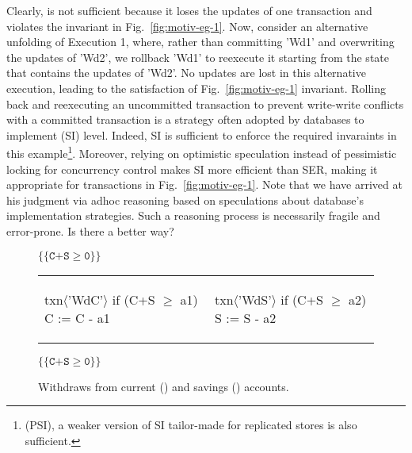 Clearly,  is not sufficient because it loses the
updates of one transaction and violates the invariant in
Fig.~\ref{fig:motiv-eg-1}. Now, consider an alternative unfolding of
Execution 1, where, rather than committing 'Wd1' and overwriting the
updates of 'Wd2', we rollback 'Wd1' to reexecute it starting from the
state that contains the updates of 'Wd2'. No updates are lost in this
alternative execution, leading to the satisfaction of
Fig.~\ref{fig:motiv-eg-1} invariant. Rolling back and reexecuting an
uncommitted transaction to prevent write-write conflicts with a
committed transaction is a strategy often adopted by databases to
implement  (SI) level. Indeed, SI is
sufficient to enforce the required invaraints in this
example\footnote{ (PSI), a weaker
version of SI tailor-made for replicated stores is also sufficient.}.
Moreover, relying on optimistic speculation instead of pessimistic
locking for concurrency control makes SI more efficient than SER,
making it appropriate for transactions in Fig.~\ref{fig:motiv-eg-1}.
Note that we have arrived at his judgment via adhoc reasoning based on
speculations about database's implementation strategies. Such a
reasoning process is necessarily fragile and error-prone. Is there a
better way?

\begin{figure}
\centering
$\{\{\texttt{C+S}\ge\texttt{0}\}\}$
\begin{tabular}{l||l}
\begin{txnimpcode}
  txn$\langle$'WdC'$\rangle${
    if (C+S $\ge$ a1) {
      C := C - a1
    }
  }
\end{txnimpcode}
&
\begin{txnimpcode}
  txn$\langle$'WdS'$\rangle${
    if (C+S $\ge$ a2) {
      S := S - a2
    }
  }
\end{txnimpcode}
\\
\end{tabular}
$\{\{\texttt{C+S}\ge\texttt{0}\}\}$

\caption{Withdraws from current () and savings () accounts.}
\label{fig:motiv-eg-2}
\end{figure}

